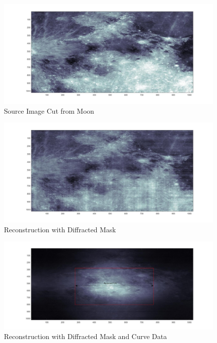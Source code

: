 \begin{figure}[]
\centering
\includegraphics[width = 0.50\linewidth]{pics/OriginalImage.jpg}
\caption{Source Image Cut from Moon}
\label{fig:Orig}
\end{figure}

\begin{figure}[]
\centering
\includegraphics[width = 0.50\linewidth]{pics/OriginalImageDiffRec.jpg}
\caption{Reconstruction with Diffracted Mask}
\label{fig:Rec_Diff}
\end{figure}

\begin{figure}[]
\centering
\includegraphics[width = 0.50\linewidth]{pics/ImageRecWithAcc.jpg}
\caption{Reconstruction with Diffracted Mask and Curve Data}
\label{fig:Rec_Acc}
\end{figure}

